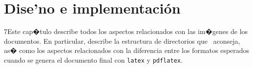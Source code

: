 %
%
%
%
%
%
%
%
%
%

\chapter{Dise'no e implementaci\'on}
\label{cap4}
\label{cap:implementacion}


\begin{FraseCelebre}
\begin{Frase}
\end{Frase}
\begin{Fuente}
\end{Fuente}
\end{FraseCelebre}

\begin{resumen}
7Este cap�tulo describe todos los aspectos relacionados con las
im�genes de los documentos. En particular, describe la estructura de
directorios que \texis\ aconseja, as� como los aspectos
relacionados con la diferencia entre los formatos esperados cuando
se genera el documento final con \texttt{latex} y \texttt{pdflatex}.
\end{resumen}

